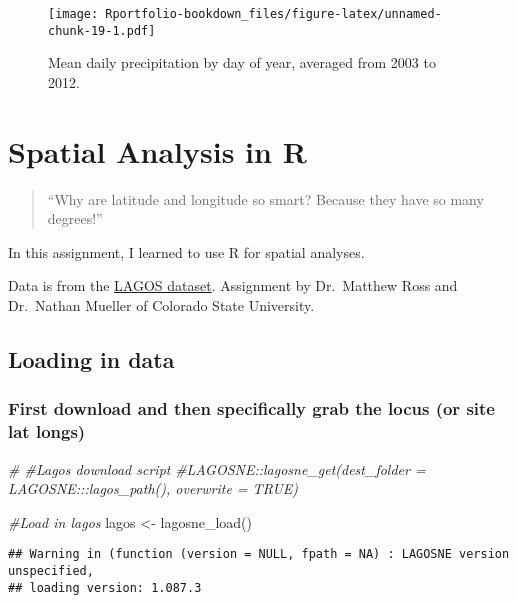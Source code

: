 \documentclass[
]{book}
\newenvironment{Shaded}{\begin{snugshade}}{\end{snugshade}}
\newcommand{\CommentTok}[1]{\textcolor[rgb]{0.56,0.35,0.01}{\textit{#1}}}
\newcommand{\FunctionTok}[1]{\textcolor[rgb]{0.00,0.00,0.00}{#1}}
\newcommand{\NormalTok}[1]{#1}
\newcommand{\OtherTok}[1]{\textcolor[rgb]{0.56,0.35,0.01}{#1}}
\begin{document}
\begin{figure}
\centering
\texttt{[image: Rportfolio-bookdown\_files/figure-latex/unnamed-chunk-19-1.pdf]}
\caption{\label{fig:unnamed-chunk-19}Mean daily precipitation by day of year, averaged from 2003 to 2012.}
\end{figure}

\hypertarget{spatial-analysis-in-r}{%
\chapter{Spatial Analysis in R}\label{spatial-analysis-in-r}}

\begin{quote}
``Why are latitude and longitude so smart? Because they have so many degrees!''
\end{quote}

In this assignment, I learned to use R for spatial analyses.

Data is from the \href{https://lagoslakes.org/}{LAGOS dataset}. Assignment by Dr.~Matthew Ross and Dr.~Nathan Mueller of Colorado State University.

\hypertarget{loading-in-data}{%
\section{Loading in data}\label{loading-in-data}}

\hypertarget{first-download-and-then-specifically-grab-the-locus-or-site-lat-longs}{%
\subsection{First download and then specifically grab the locus (or site lat longs)}\label{first-download-and-then-specifically-grab-the-locus-or-site-lat-longs}}

\begin{Shaded}
\begin{Highlighting}[]
\CommentTok{\# \#Lagos download script}
\CommentTok{\#LAGOSNE::lagosne\_get(dest\_folder = LAGOSNE:::lagos\_path(), overwrite = TRUE)}


\CommentTok{\#Load in lagos}
\NormalTok{lagos }\OtherTok{\textless{}{-}} \FunctionTok{lagosne\_load}\NormalTok{()}
\end{Highlighting}
\end{Shaded}

\begin{verbatim}
## Warning in (function (version = NULL, fpath = NA) : LAGOSNE version unspecified,
## loading version: 1.087.3
\end{verbatim}
\end{document}
